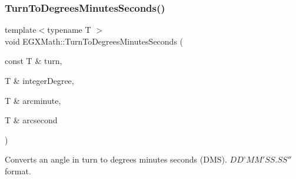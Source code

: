 \subsubsection{\texorpdfstring{Turn\+To\+Degrees\+Minutes\+Seconds()}{TurnToDegreesMinutesSeconds()}}
{\footnotesize\ttfamily template$<$typename T $>$ \\
void E\+G\+X\+Math\+::\+Turn\+To\+Degrees\+Minutes\+Seconds (\begin{DoxyParamCaption}\item[{const T \&}]{turn,  }\item[{T \&}]{integer\+Degree,  }\item[{T \&}]{arcminute,  }\item[{T \&}]{arcsecond }\end{DoxyParamCaption})}



Converts an angle in turn to degrees minutes seconds (D\+MS). ${DD}^{\circ}{MM}'{SS.SS}''$ format. 


